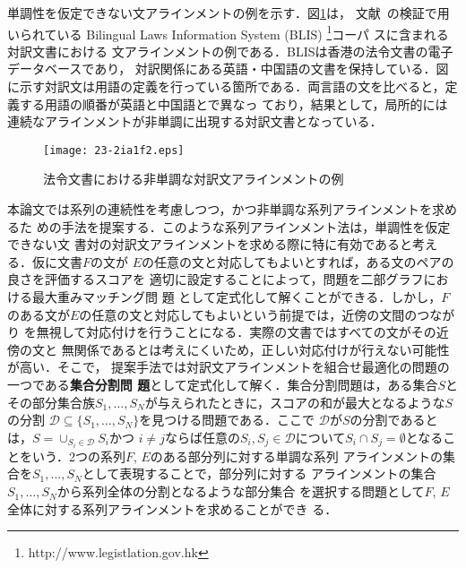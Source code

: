 \documentclass[japanese]{jnlp_1.4}
\begin{document}
単調性を仮定できない文アラインメントの例を示す．図\ref{fig:hourei}は，
文献~\cite{quan-kit-song:2013:ACL2013}の検証で用いられている Bilingual Laws
Information System (BLIS) \footnote{http://www.legistlation.gov.hk}コーパ
スに含まれる対訳文書における
文アラインメントの例である．BLISは香港の法令文書の電子データベースであり，
対訳関係にある英語・中国語の文書を保持している．図に示す対訳文は用語の定義を行っている箇所である．両言語の文を比べると，定義する用語の順番が英語と中国語とで異なっ
ており，結果として，局所的には連続なアラインメントが非単調に出現する対訳文書となっている．

\begin{figure}[t]
\begin{center}
\texttt{[image: 23-2ia1f2.eps]}
\end{center}
\caption{法令文書における非単調な対訳文アラインメントの例}
\label{fig:hourei}
\end{figure}

本論文では系列の連続性を考慮しつつ，かつ非単調な系列アラインメントを求めるた
めの手法を提案する．このような系列アラインメント法は，単調性を仮定できない文
書対の対訳文アラインメントを求める際に特に有効であると考える．仮に文書$F$の文が
$E$の任意の文と対応してもよいとすれば，ある文のペアの良さを評価するスコアを
適切に設定することによって，問題を二部グラフにおける最大重みマッチング問
題 \cite{korte08:_combin_optim}として定式化して解くことができる．しかし，$F$
のある文が$E$の任意の文と対応してもよいという前提では，近傍の文間のつながり
を無視して対応付けを行うことになる．実際の文書ではすべての文がその近傍の文と
無関係であるとは考えにくいため，正しい対応付けが行えない可能性が高い．そこで，
提案手法では対訳文アラインメントを組合せ最適化の問題の一つである\textbf{集合分割問
題}として定式化して解く．集合分割問題は，ある集合$S$とその部分集合族$S_1,
\ldots, S_N$が与えられたときに，スコアの和が最大となるような$S$の分割
$\mathcal{D} \subseteq \{S_1, \ldots, S_N\}$を見つける問題である．ここで
$\mathcal{D}$が$S$の分割であるとは，$S = \cup_{S_i \in \mathcal{D}} S_i$かつ
$i\neq j$ならば任意の$S_i, S_j \in \mathcal{D}$について$S_i \cap S_j =
\emptyset$となることをいう．2つの系列$F$, $E$のある部分列に対する単調な系列
アラインメントの集合を$S_1, \ldots, S_N$として表現することで，部分列に対する
アラインメントの集合$S_1, \ldots, S_N$から系列全体の分割となるような部分集合
を選択する問題として$F$, $E$全体に対する系列アラインメントを求めることができ
る．
\end{document}
